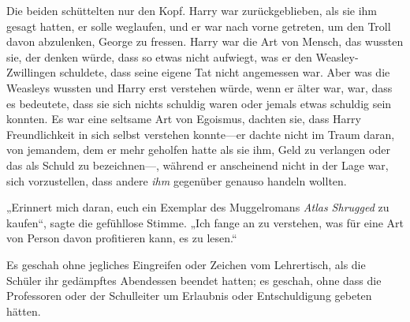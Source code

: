 Die beiden schüttelten nur den Kopf.
Harry war zurückgeblieben, als sie ihm gesagt hatten, er solle weglaufen, und er war nach vorne getreten, um den Troll davon abzulenken, George zu fressen. Harry war die Art von Mensch, das wussten sie, der denken würde, dass so etwas nicht aufwiegt, was er den Weasley-Zwillingen schuldete, dass seine eigene Tat nicht angemessen war. Aber was die Weasleys wussten und Harry erst verstehen würde, wenn er älter war, war, dass es bedeutete, dass sie sich nichts schuldig waren oder jemals etwas schuldig sein konnten. Es war eine seltsame Art von Egoismus, dachten sie, dass Harry Freundlichkeit in sich selbst verstehen konnte—er dachte nicht im Traum daran, von jemandem, dem er mehr geholfen hatte als sie ihm, Geld zu verlangen oder das als Schuld zu bezeichnen—, während er anscheinend nicht in der Lage war, sich vorzustellen, dass andere \emph{ihm} gegenüber genauso handeln wollten.

„Erinnert mich daran, euch ein Exemplar des Muggelromans \emph{Atlas Shrugged} zu kaufen“, sagte die gefühllose Stimme. „Ich fange an zu verstehen, was für eine Art von Person davon profitieren kann, es zu lesen.“


Es geschah ohne jegliches Eingreifen oder Zeichen vom Lehrertisch, als die Schüler ihr gedämpftes Abendessen beendet hatten; es geschah, ohne dass die Professoren oder der Schulleiter um Erlaubnis oder Entschuldigung gebeten hätten.

